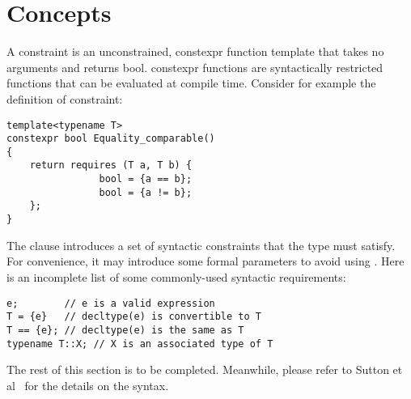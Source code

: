\section{\Cpp{} Concepts} %
\label{sec:prelim}

A constraint is an unconstrained, constexpr function template that takes no 
arguments and returns bool. constexpr functions are syntactically restricted 
functions that can be evaluated at compile time. Consider for example the 
definition of  constraint:

\begin{lstlisting}
template<typename T>
constexpr bool Equality_comparable()
{
    return requires (T a, T b) {
                bool = {a == b};
                bool = {a != b};
    };
}
\end{lstlisting}

\noindent
The  clause introduces a set of syntactic constraints that the 
type  must satisfy. For convenience, it may introduce some formal 
parameters to avoid using . Here is an incomplete list of some 
commonly-used syntactic requirements:

\begin{lstlisting}
e;        // e is a valid expression
T = {e}   // decltype(e) is convertible to T
T == {e}; // decltype(e) is the same as T
typename T::X; // X is an associated type of T
\end{lstlisting}

The rest of this section is to be completed. Meanwhile, please refer to Sutton 
et al~\cite{N3580} for the details on the syntax.

%
%
